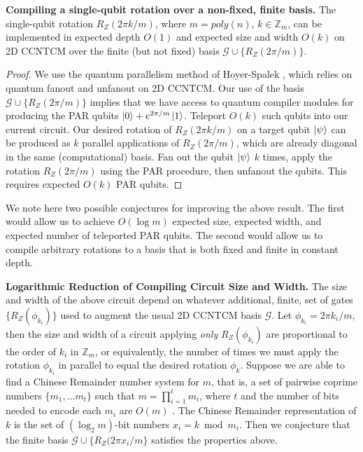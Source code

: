 \begin{theorem}{\textbf{Compiling a single-qubit rotation over a non-fixed, finite basis.}}
The single-qubit rotation $R_Z(2\pi k /m)$, where $m = poly(n)$,
$k \in \mathbb{Z}_m$,
can be implemented in expected depth $O(1)$ and expected size and width $O(k)$ on
\textsf{2D CCNTCM} over the finite
(but not fixed) basis $\mathcal{G} \cup \{R_Z(2\pi / m)\}$.
\end{theorem}

\begin{proof}
We use the quantum parallelism method of Hoyer-Spalek \cite{Hoyer2002},
which relies on quantum fanout and unfanout on \textsf{2D CCNTCM}.
Our use of the basis $\mathcal{G} \cup \{R_Z(2\pi / m)\}$ implies that
we have access to quantum compiler modules for producing the
PAR qubits $\left\vert{0}\right\rangle + e^{2\pi / m}\left\vert{1}\right\rangle$. Teleport $O(k)$ such qubits
into our current circuit.
Our desired rotation of $R_Z(2\pi k / m)$ on a target qubit $\left\vert{\psi}\right\rangle$
can be produced as $k$
parallel applications of $R_Z(2\pi / m)$, which are already diagonal in
the same (computational) basis. Fan out the qubit $\left\vert{\psi}\right\rangle$ $k$ times,
apply the rotation $R_Z(2\pi /m)$ using the PAR procedure, then unfanout the
qubits.
This requires expected $O(k)$ PAR qubits.
\end{proof}

We note here two possible conjectures for improving the above result.
The first would allow us to achieve $O(\log m)$
expected size, expected width, and
expected number of teleported PAR qubits. The second would allow us to
compile arbitrary rotations to a basis that is both fixed and finite
in constant depth.

\begin{conjecture}{\textbf{Logarithmic Reduction of Compiling Circuit Size and Width.}}
The size and width of the above circuit depend on whatever additional,
finite, set of 
gates
$\{ R_Z(\phi_{k_i}) \}$ used to augment the usual \textsf{2D CCNTCM} basis
$\mathcal{G}$. Let $\phi_{k_i} = 2\pi k_i / m$, then the size and width of
a circuit applying \emph{only} $R_Z(\phi_{k_i})$
are proportional to the order of $k_i$ in
$\mathbb{Z}_m$, or equivalently, the number of times we must apply
the rotation $\phi_{k_i}$ in parallel to equal the desired rotation
$\phi_k$. Suppose we are able to find a Chinese Remainder number system
for $m$, that is, a set of pairwise coprime numbers $\{m_1, \ldots m_{t}\}$
such that $m = \prod_{i=1}^t m_i $, where $t$ and the number of bits
needed to encode each $m_i$ are $O(m)$ \cite{Yeh1996}.
The Chinese Remainder representation of $k$
is the set of $(\log_2 m)$-bit numbers
$x_i = k \bmod m_i$. 
Then we conjecture that
the finite basis $\mathcal{G} \cup \{R_Z(2\pi x_i / m\}$ satisfies the
properties above.
\end{conjecture}

